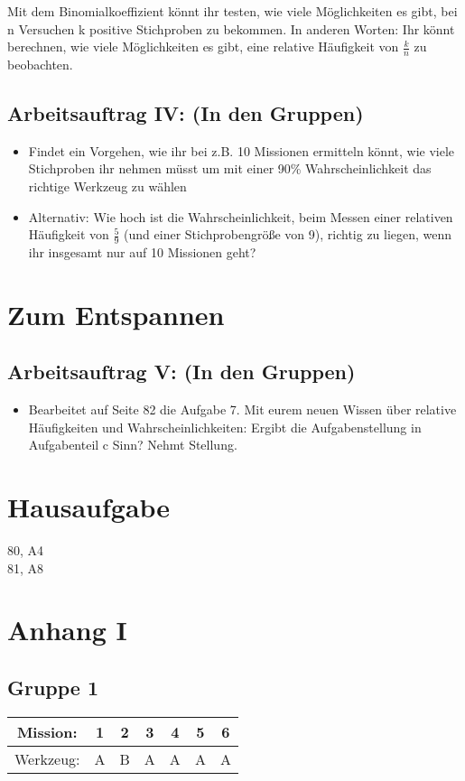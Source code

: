 \documentclass[]{article}
\begin{document}
Mit dem Binomialkoeffizient könnt ihr testen, wie viele Möglichkeiten es gibt, bei n Versuchen k positive Stichproben zu bekommen. In anderen Worten: Ihr könnt berechnen, wie viele Möglichkeiten es gibt, eine relative Häufigkeit von $\frac{k}{n}$ zu beobachten. 

\subsection*{Arbeitsauftrag IV: (In den Gruppen)}
\begin{itemize}
	\item Findet ein Vorgehen, wie ihr bei z.B. 10 Missionen ermitteln könnt, wie viele Stichproben ihr nehmen müsst um mit einer 90\% Wahrscheinlichkeit das richtige Werkzeug zu wählen
	\item Alternativ: Wie hoch ist die Wahrscheinlichkeit, beim Messen einer relativen Häufigkeit von $\frac{5}{9}$ (und einer Stichprobengröße von 9), richtig zu liegen, wenn ihr insgesamt nur auf 10 Missionen geht?
\end{itemize}

\section*{Zum Entspannen}

\subsection*{Arbeitsauftrag V: (In den Gruppen)}
\begin{itemize}
	\item Bearbeitet auf Seite 82 die Aufgabe 7. Mit eurem neuen Wissen über relative Häufigkeiten und Wahrscheinlichkeiten: Ergibt die Aufgabenstellung in Aufgabenteil c Sinn? Nehmt Stellung. 
\end{itemize}

\section*{Hausaufgabe}
80, A4\\
81, A8\\







\newpage
\section*{Anhang I}
\subsection*{Gruppe 1}
\begin{tabular}{|c|c|c|c|c|c|c|}
\hline
Mission: & 1 & 2 & 3 & 4 & 5 & 6\\
\hline
Werkzeug: & A & B & A & A & A & A\\
\hline
\end{tabular}
\end{document}
